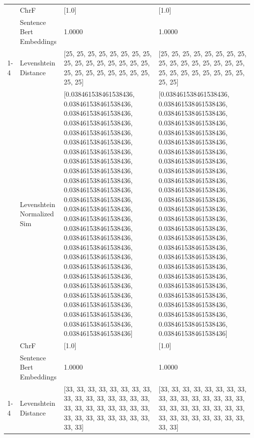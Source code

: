 \begin{tabular}{llll}
 & ChrF & [1.0] & [1.0] \\
 & Sentence Bert Embeddings & 1.0000 & 1.0000 \\
\cline{1-4}
\multirow[t]{4}{*}{Rituko ri'obuya nigo rire engencho.} & Levenshtein Distance & [25, 25, 25, 25, 25, 25, 25, 25, 25, 25, 25, 25, 25, 25, 25, 25, 25, 25, 25, 25, 25, 25, 25, 25, 25, 25] & [25, 25, 25, 25, 25, 25, 25, 25, 25, 25, 25, 25, 25, 25, 25, 25, 25, 25, 25, 25, 25, 25, 25, 25, 25, 25] \\
 & Levenshtein Normalized Sim & [0.038461538461538436, 0.038461538461538436, 0.038461538461538436, 0.038461538461538436, 0.038461538461538436, 0.038461538461538436, 0.038461538461538436, 0.038461538461538436, 0.038461538461538436, 0.038461538461538436, 0.038461538461538436, 0.038461538461538436, 0.038461538461538436, 0.038461538461538436, 0.038461538461538436, 0.038461538461538436, 0.038461538461538436, 0.038461538461538436, 0.038461538461538436, 0.038461538461538436, 0.038461538461538436, 0.038461538461538436, 0.038461538461538436, 0.038461538461538436, 0.038461538461538436, 0.038461538461538436] & [0.038461538461538436, 0.038461538461538436, 0.038461538461538436, 0.038461538461538436, 0.038461538461538436, 0.038461538461538436, 0.038461538461538436, 0.038461538461538436, 0.038461538461538436, 0.038461538461538436, 0.038461538461538436, 0.038461538461538436, 0.038461538461538436, 0.038461538461538436, 0.038461538461538436, 0.038461538461538436, 0.038461538461538436, 0.038461538461538436, 0.038461538461538436, 0.038461538461538436, 0.038461538461538436, 0.038461538461538436, 0.038461538461538436, 0.038461538461538436, 0.038461538461538436, 0.038461538461538436] \\
 & ChrF & [1.0] & [1.0] \\
 & Sentence Bert Embeddings & 1.0000 & 1.0000 \\
\cline{1-4}
\multirow[t]{4}{*}{Enyang’au tiboyera rituko ri’oboncho.} & Levenshtein Distance & [33, 33, 33, 33, 33, 33, 33, 33, 33, 33, 33, 33, 33, 33, 33, 33, 33, 33, 33, 33, 33, 33, 33, 33, 33, 33, 33, 33, 33, 33, 33, 33, 33, 33] & [33, 33, 33, 33, 33, 33, 33, 33, 33, 33, 33, 33, 33, 33, 33, 33, 33, 33, 33, 33, 33, 33, 33, 33, 33, 33, 33, 33, 33, 33, 33, 33, 33, 33] \\

\end{tabular}
